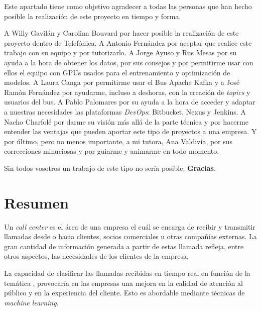 Este apartado tiene como objetivo agradecer a todas las personas que han hecho posible la realización de este proyecto en tiempo y forma.


A Willy Gavilán y Carolina Bouvard por hacer posible la  realización de este proyecto dentro de Telefónica. A Antonio Fernández por aceptar que realice este trabajo con su equipo y por tutorizarlo. A Jorge Ayuso y Rus Mesas por su ayuda a la hora de obtener los datos, por sus consejos y por permitirme usar con ellos el equipo con GPUs usados para  el entrenamiento y optimización de modelos. A Laura Canga por permitirme usar el Bus Apache Kafka y a José Ramón Fernández por ayudarme, incluso a deshoras, con la creación de \textit{topics} y usuarios del bus.  A Pablo Palomares por su ayuda a la hora de acceder y adaptar a nuestras necesidades las plataformas \textit{DevOps}: Bitbucket, Nexus y Jenkins. A Nacho Charfolé por darme su visión más allá de la parte técnica y por hacerme entender las ventajas que pueden aportar este tipo de proyectos a una empresa. Y por último, pero no menos importante, a mi tutora, Ana Valdivia, por sus correcciones minuciosas y por guiarme y animarme en todo momento.

Sin todos vosotros un trabajo de este tipo no sería posible. \textbf{{\LARGE Gracias}}.


\chapter*{Resumen}


Un \textit{call center} es el área de una empresa el cuál se encarga de recibir y transmitir llamadas desde o hacia clientes, socios comerciales u otras compañías externas. La gran cantidad de información generada a partir de estas llamada refleja, entre otros aspectos, las necesidades de los clientes de la empresa. 


La capacidad de clasificar las llamadas recibidas en tiempo real en función de la temática , provocaría en las empresas una mejora en la calidad de atención al público y en la experiencia del cliente.  Esto es abordable mediante técnicas de \textit{machine learning}.



